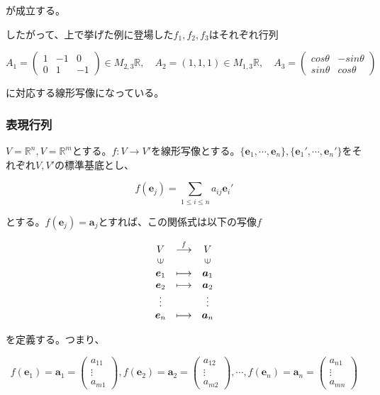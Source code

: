 \documentclass[dvipdfmx,autodetect-engine]{jsarticle}
\theoremstyle{definition}
\newcommand{\vecSpace}[1]{\mathbb{R}^{#1}}
\begin{document}
が成立する。

したがって、上で挙げた例に登場した$f_1, f_2, f_3$はそれぞれ行列

$$
A_1 = \begin{pmatrix}
1 & -1 & 0 \\
0 & 1 & -1
\end{pmatrix} \in M_{2,3}\mathbb{R}, \quad
A_2 = (1, 1, 1) \in M_{1,3}\mathbb{R}, \quad
A_3 = \begin{pmatrix}
cos\theta & -sin\theta \\
sin\theta & cos\theta
\end{pmatrix}
$$

に対応する線形写像になっている。

\subsubsection{表現行列}

$V = \vecSpace{n}, V = \vecSpace{m}$とする。$f: V \to V'$を線形写像とする。$\{\bm{e}_1, \cdots, \bm{e}_n\}, \{\bm{e}_1', \cdots, \bm{e}_n'\}$をそれぞれ$V, V'$の標準基底とし、

$$
f(\bm{e}_j) = \sum_{1 \leq i \leq n} a_{ij}\bm{e}_{i}'
$$

とする。$f(\bm{e}_j) = \bm{a}_j$とすれば、この関係式は以下の写像$f$

$$
\begin{array}{ccc}
V & \stackrel{f}{\longrightarrow}  & V \\
\rotatebox{90}{$\in$} & & \rotatebox{90}{$\in$} \\
\bm{e}_1 & \longmapsto & \bm{a}_1 \\
\bm{e}_2 & \longmapsto & \bm{a}_2 \\
\vdots & & \vdots \\
\bm{e}_n & \longmapsto & \bm{a}_n
\end{array}
$$

を定義する。つまり、

$$
f(\bm{e}_1) = \bm{a}_1 = \begin{pmatrix}
a_{11} \\
\vdots \\
a_{m1}
\end{pmatrix}, 
f(\bm{e}_2) = \bm{a}_2 = \begin{pmatrix}
a_{12} \\
\vdots \\
a_{m2}
\end{pmatrix}, 
\cdots,
f(\bm{e}_n) = \bm{a}_n = \begin{pmatrix}
a_{n1} \\
\vdots \\
a_{mn}
\end{pmatrix}
$$
\end{document}
